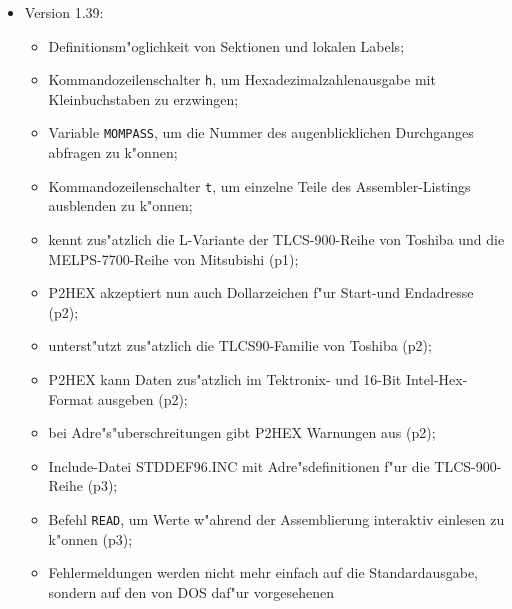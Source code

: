 \documentclass[12pt,a4paper,twoside]{report}
\newcommand{\tty}[1]{{\tt #1}}
\begin{document}
\begin{itemize}
{\begin{itemize}
      \item{..sowie die 3201x-Signalprozessoren von Texas Instruments (p2);}
      \item{Option \tty{F} bei P2HEX, um die automatische Formatwahl "ubersteuern
            zu k"onnen (p2);}
      \item{P2BIN kann nun auch durch Angabe von Dollarzeichen Anfang und
            Ende des Adre"sfensters selbstst"andig festlegen (p2);}
      \item{Der 8048-Codegenerator kennt nun auch die 8041/42-
            Befehlserweiterungen(p2);}
      \item{unterst"utzt zus"atzlich die Zilog Z8-Mikrokontroller(p3).}
      \end{itemize}}
\item{Version 1.39:
      \begin{itemize}
      \item{Definitionsm"oglichkeit von Sektionen und lokalen Labels;}
      \item{Kommandozeilenschalter \tty{h}, um Hexadezimalzahlenausgabe mit
            Kleinbuchstaben zu erzwingen;}
      \item{Variable \tty{MOMPASS}, um die Nummer des augenblicklichen Durchganges
            abfragen zu k"onnen;}
      \item{Kommandozeilenschalter \tty{t}, um einzelne Teile des Assembler-Listings
            ausblenden zu k"onnen;}
      \item{kennt zus"atzlich die L-Variante der TLCS-900-Reihe von Toshiba
            und die MELPS-7700-Reihe von Mitsubishi (p1);}
      \item{P2HEX akzeptiert nun auch Dollarzeichen f"ur Start-und Endadresse
            (p2);}
      \item{unterst"utzt zus"atzlich die TLCS90-Familie von Toshiba (p2);}
      \item{P2HEX kann Daten zus"atzlich im Tektronix- und 16-Bit
            Intel-Hex-Format ausgeben (p2);}
      \item{bei Adre"s"uberschreitungen gibt P2HEX Warnungen aus (p2);}
      \item{Include-Datei STDDEF96.INC mit Adre"sdefinitionen f"ur die
            TLCS-900-Reihe (p3);}
      \item{Befehl \tty{READ}, um Werte w"ahrend der Assemblierung interaktiv
            einlesen zu k"onnen (p3);}
      \item{Fehlermeldungen werden nicht mehr einfach auf die
            Standardausgabe, sondern auf den von DOS daf"ur vorgesehenen
}
\end{itemize}}
\end{itemize}
\end{document}
